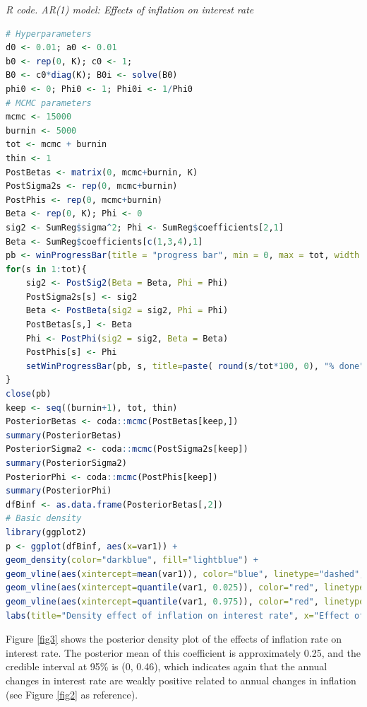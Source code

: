 \begin{tcolorbox}[enhanced,width=4.67in,center upper,
	fontupper=\large\bfseries,drop shadow southwest,sharp corners]
	\textit{R code. AR(1) model: Effects of inflation on interest rate}
	\begin{VF}
		\begin{lstlisting}[language=R]
# Hyperparameters
d0 <- 0.01; a0 <- 0.01
b0 <- rep(0, K); c0 <- 1; 
B0 <- c0*diag(K); B0i <- solve(B0)
phi0 <- 0; Phi0 <- 1; Phi0i <- 1/Phi0
# MCMC parameters
mcmc <- 15000
burnin <- 5000
tot <- mcmc + burnin
thin <- 1
PostBetas <- matrix(0, mcmc+burnin, K)
PostSigma2s <- rep(0, mcmc+burnin)
PostPhis <- rep(0, mcmc+burnin)
Beta <- rep(0, K); Phi <- 0
sig2 <- SumReg$sigma^2; Phi <- SumReg$coefficients[2,1]
Beta <- SumReg$coefficients[c(1,3,4),1]
pb <- winProgressBar(title = "progress bar", min = 0, max = tot, width = 300)
for(s in 1:tot){
	sig2 <- PostSig2(Beta = Beta, Phi = Phi)
	PostSigma2s[s] <- sig2
	Beta <- PostBeta(sig2 = sig2, Phi = Phi)
	PostBetas[s,] <- Beta
	Phi <- PostPhi(sig2 = sig2, Beta = Beta)
	PostPhis[s] <- Phi
	setWinProgressBar(pb, s, title=paste( round(s/tot*100, 0), "% done"))
}
close(pb)
keep <- seq((burnin+1), tot, thin)
PosteriorBetas <- coda::mcmc(PostBetas[keep,])
summary(PosteriorBetas)
PosteriorSigma2 <- coda::mcmc(PostSigma2s[keep])
summary(PosteriorSigma2)
PosteriorPhi <- coda::mcmc(PostPhis[keep])
summary(PosteriorPhi)
dfBinf <- as.data.frame(PosteriorBetas[,2])
# Basic density
library(ggplot2)
p <- ggplot(dfBinf, aes(x=var1)) + 
geom_density(color="darkblue", fill="lightblue") +
geom_vline(aes(xintercept=mean(var1)), color="blue", linetype="dashed", linewidth=1) +
geom_vline(aes(xintercept=quantile(var1, 0.025)), color="red", linetype="dashed", linewidth=1) +
geom_vline(aes(xintercept=quantile(var1, 0.975)), color="red", linetype="dashed", linewidth=1) +
labs(title="Density effect of inflation on interest rate", x="Effect of inflation", y = "Density")
\end{lstlisting}
	\end{VF}
\end{tcolorbox}

Figure \ref{fig3} shows the posterior density plot of the effects of inflation rate on interest rate. The posterior mean of this coefficient is approximately 0.25, and the credible interval at 95\% is (0, 0.46), which indicates again that the annual changes in interest rate are weakly positive related to annual changes in inflation (see Figure \ref{fig2} as reference). 

